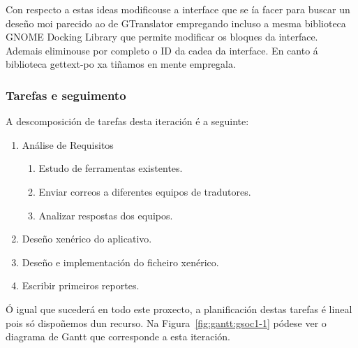 Con respecto a estas ideas modificouse a interface que se ía facer para buscar un deseño moi parecido ao de GTranslator empregando incluso a mesma biblioteca GNOME Docking Library que permite modificar os bloques da interface. Ademais eliminouse por completo o ID da cadea da interface. En canto á biblioteca gettext-po xa tiñamos en mente empregala.

\subsubsection{Tarefas e seguimento}

A descomposición de tarefas desta iteración é a seguinte:

\begin{enumerate}[label=\bfseries WBS 1.\arabic*]
  \item Análise de Requisitos
    \begin{enumerate}[label=\bfseries WBS 1.1.\arabic*]
      \item Estudo de ferramentas existentes.
      \item Enviar correos a diferentes equipos de tradutores.
      \item Analizar respostas dos equipos.
    \end{enumerate}
  \item Deseño xenérico do aplicativo.
  \item Deseño e implementación do ficheiro xenérico.
  \item Escribir primeiros reportes.
\end{enumerate}

Ó igual que sucederá en todo este proxecto, a planificación destas tarefas é lineal pois só dispoñemos dun recurso. Na Figura~\ref{fig:gantt:gsoc1-1} pódese ver o diagrama de Gantt que corresponde a esta iteración.


